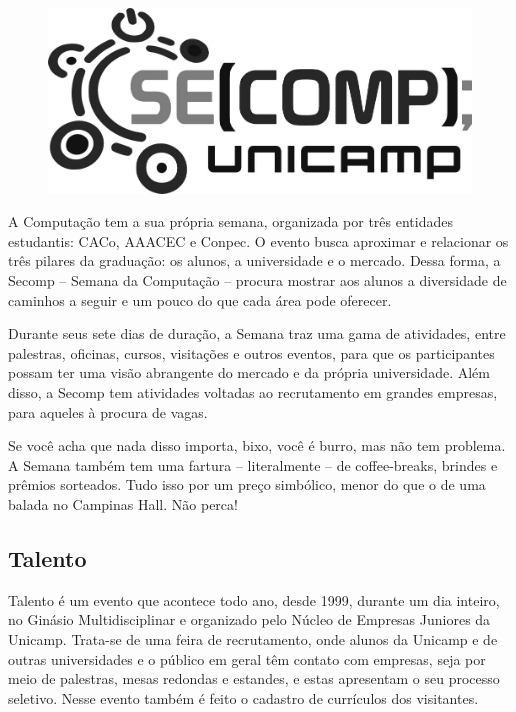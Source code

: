 \begin{figure}[H]
    \centering
    \includegraphics[scale=0.20]{img/secomp.png}
\end{figure}

A Computação tem a sua própria semana, organizada por três entidades estudantis:
CACo, AAACEC e Conpec. O evento busca aproximar e relacionar os três pilares da
graduação: os alunos, a universidade e o mercado. Dessa forma, a Secomp --
Semana da Computação -- procura mostrar aos alunos a diversidade de caminhos a
seguir e um pouco do que cada área pode oferecer.

Durante seus sete dias de duração, a Semana traz uma gama de atividades, entre
palestras, oficinas, cursos, visitações e outros eventos, para que os
participantes possam ter uma visão abrangente do mercado e da própria
universidade. Além disso, a Secomp tem atividades voltadas ao recrutamento em
grandes empresas, para aqueles à procura de vagas.

Se você acha que nada disso importa, bixo, você é burro, mas não tem problema.
A Semana também tem uma fartura -- literalmente -- de coffee-breaks, brindes e
prêmios sorteados. Tudo isso por um preço simbólico, menor do que o de uma
balada no Campinas Hall. Não perca!

\subsection{Talento}

Talento é um evento que acontece todo ano, desde 1999, durante um dia inteiro,
no Ginásio Multidisciplinar e organizado pelo Núcleo de Empresas Juniores da
Unicamp. Trata-se de uma feira de recrutamento, onde alunos da Unicamp e de
outras universidades e o público em geral têm contato com empresas, seja por
meio de palestras, mesas redondas e estandes, e estas apresentam o seu processo
seletivo. Nesse evento também é feito o cadastro de currículos dos visitantes.

